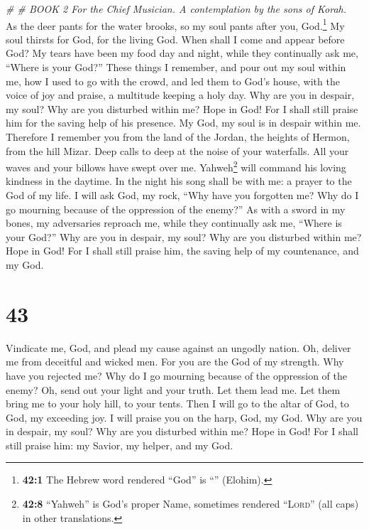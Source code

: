 \emph{\# \# BOOK 2 For the Chief Musician. A contemplation by the sons
of Korah.}\\
 As the deer pants for the water brooks, so my soul pants
after you, God.\footnote{\textbf{42:1} The Hebrew word rendered ``God''
  is ``'' (Elohim).}  My soul thirsts for
God, for the living God. When shall I come and appear before God?
 My tears have been my food day and night, while they
continually ask me, ``Where is your God?''  These things I
remember, and pour out my soul within me, how I used to go with the
crowd, and led them to God's house, with the voice of joy and praise, a
multitude keeping a holy day.  Why are you in despair, my
soul? Why are you disturbed within me? Hope in God! For I shall still
praise him for the saving help of his presence.  My God,
my soul is in despair within me. Therefore I remember you from the land
of the Jordan, the heights of Hermon, from the hill Mizar.
 Deep calls to deep at the noise of your waterfalls. All
your waves and your billows have swept over me. 
Yahweh\footnote{\textbf{42:8} ``Yahweh'' is God's proper Name, sometimes
  rendered ``\textsc{Lord}'' (all caps) in other translations.} will
command his loving kindness in the daytime. In the night his song shall
be with me: a prayer to the God of my life.  I will ask
God, my rock, ``Why have you forgotten me? Why do I go mourning because
of the oppression of the enemy?''  As with a sword in my
bones, my adversaries reproach me, while they continually ask me,
``Where is your God?''  Why are you in despair, my soul?
Why are you disturbed within me? Hope in God! For I shall still praise
him, the saving help of my countenance, and my God.

\hypertarget{section-42}{%
\section{43}\label{section-42}}

 Vindicate me, God, and plead my cause against an ungodly
nation. Oh, deliver me from deceitful and wicked men.  For
you are the God of my strength. Why have you rejected me? Why do I go
mourning because of the oppression of the enemy?  Oh, send
out your light and your truth. Let them lead me. Let them bring me to
your holy hill, to your tents.  Then I will go to the
altar of God, to God, my exceeding joy. I will praise you on the harp,
God, my God.  Why are you in despair, my soul? Why are you
disturbed within me? Hope in God! For I shall still praise him: my
Savior, my helper, and my God.

